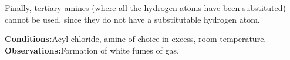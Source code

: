 				Finally, tertiary amines (where all the hydrogen atoms have been substituted) cannot be used, since they do not have a
				substitutable hydrogen atom.


				\vspace{1.5em}
				\vbox{\textbf{Conditions:}\tabto{35mm}Acyl chloride, amine of choice in excess, room temperature.}
				\vbox{\textbf{Observations:}\tabto{35mm}Formation of white fumes of  gas.}










































